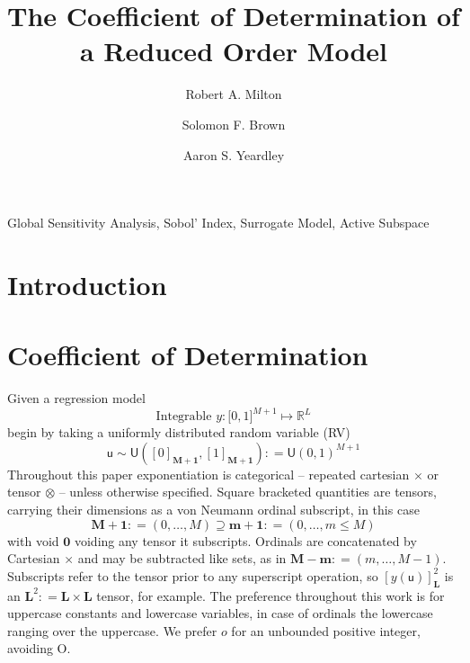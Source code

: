 \documentclass[preprint,12pt]{elsarticle}
\newcommand*{\M}[1]{\ensuremath{#1}\xspace}
\newcommand*{\x}{\times}
\newcommand*{\mi}[1]{\mathbf{#1}}
\newcommand*{\st}[1]{\mathbb{#1}}
\newcommand*{\rv}[1]{\mathsf{#1}}
\newcommand*{\te}[2][]{\left\lbrack{#2}\right\rbrack_{#1}}
\newcommand*{\deq}{\M{\mathrel{\mathop:}=}}
\newcommand{\T}[1]{\text{#1}}
\newcommand*{\uni}[2]{\mathsf{U}\!\left({#1,#2}\right)}
\newcommand*{\uniti}{\lbrack 0,1\rbrack}
\begin{document}
\begin{frontmatter}

    \title{The Coefficient of Determination of a Reduced Order Model}

    \author{Robert A. Milton}

    \author{Solomon F. Brown}

    \author{Aaron S. Yeardley}

    \address{Department of Chemical and Biological Engineering, University of Sheffield, Sheffield, S1 3JD, United Kingdom}       

    \begin{abstract}
    \end{abstract}

    \begin{keyword}
        Global Sensitivity Analysis, Sobol' Index, Surrogate Model, Active Subspace
    \end{keyword}

\end{frontmatter}

\section{Introduction}\label{sec:Intro}


\section{Coefficient of Determination}\label{sec:COD}
    Given a regression model
    \begin{equation*}
        \T{Integrable } y \colon \uniti^{M+1} \mapsto \st{R}^{L}
    \end{equation*}
    begin by taking a uniformly distributed random variable (RV)
    \begin{equation*}
        \rv{u} \sim \uni{\te[\mi{M+1}]{0}}{\te[\mi{M+1}]{1}} \deq \uni{0}{1}^{M+1}
    \end{equation*}
    Throughout this paper exponentiation is categorical -- repeated cartesian $\x$ or tensor $\otimes$ -- unless otherwise specified. Square bracketed quantities are tensors, carrying their dimensions as a von Neumann ordinal subscript, in this case
    \begin{equation*}
        \mi{M+1} \deq (0,\ldots,M) \supseteq \mi{m+1} \deq (0,\ldots,m \leq M)
    \end{equation*}
    with void $\mi{0}$ voiding any tensor it subscripts. Ordinals are concatenated by Cartesian $\times$ and may be subtracted like sets, as in $\mi{M-m} \deq (m,\ldots,M-1)$. 
    Subscripts refer to the tensor prior to any superscript operation, so $\te[\mi{L}]{y(\rv{u})}^{2}$ is an $\mi{L}^{2} \deq \mi{L\x L}$ tensor, for example.
    The preference throughout this work is for uppercase constants and lowercase variables, in case of ordinals the lowercase ranging over the uppercase. We prefer $o$ for an unbounded positive integer, avoiding O.
\end{document}
